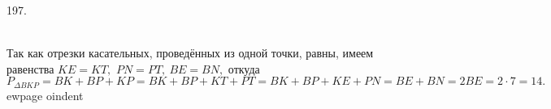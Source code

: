 197. \begin{figure}[ht!]
\end{figure}\\
Так как отрезки касательных, проведённых из одной точки, равны, имеем равенства $KE=KT,$ $PN=PT,\ BE=BN,$ откуда $P_{\Delta BKP}=BK+BP+KP=BK+BP+KT+PT=
BK+BP+KE+PN=BE+BN=2BE=2\cdot7=14.$
ewpage
oindent
